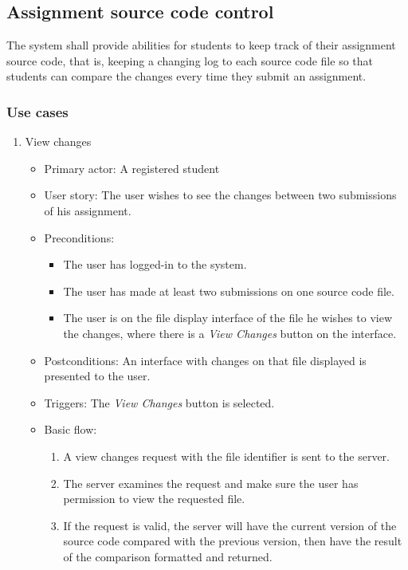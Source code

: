 \subsection{Assignment source code control}
The system shall provide abilities for students to keep track of their
assignment source code, that is, keeping a changing log to each source code
file so that students can compare the changes every time they submit an
assignment.

\subsubsection{Use cases}
\begin{enumerate}
\item View changes
\begin{itemize}
    \item Primary actor: A registered student
    \item User story: The user wishes to see the changes between two
        submissions of his assignment.
    \item Preconditions:
        \begin{itemize}
            \item The user has logged-in to the system.
            \item The user has made at least two submissions on one source code
                file.
            \item The user is on the file display interface of the file he
                wishes to view the changes, where there is a \emph{View Changes}
                button on the interface.
        \end{itemize}
    \item Postconditions:
        An interface with changes on that file displayed is presented to the
        user.
    \item Triggers:
        The \emph{View Changes} button is selected.
    \item Basic flow:
        \begin{enumerate}
            \item A view changes request with the file identifier is sent
                to the server.
            \item The server examines the request and make sure the user has
                permission to view the requested file.
            \item If the request is valid, the server will have the current
                version of the source code compared with the previous version,
                then have the result of the comparison formatted and
                returned.
        \end{enumerate}
\end{itemize}
\end{enumerate}

